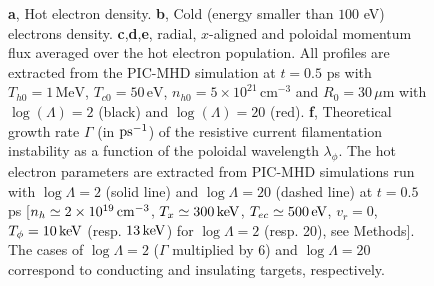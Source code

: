 \documentclass[aps,showpacs,superscriptaddress]{revtex4}
\begin{document}
\begin{figure}[ht]
{\begin{tabular}{ccc}
\end{tabular}}
\caption{\label{fig:nt} 
\textbf{a}, Hot electron  density.
\textbf{b}, Cold (energy smaller than $100$ eV) electrons density.
\textbf{c},\textbf{d},\textbf{e}, radial, $x$-aligned and poloidal momentum flux averaged over the hot electron population.
All profiles are extracted from the  PIC-MHD simulation at $t=0.5$ ps with $T_{h0} = 1\,\mathrm{MeV}$, $T_{c0} = 50\,\mathrm{eV}$, $n_{h0} = 5 \times 10^{21}\, \mathrm{cm}^{-3}$ and $R_0 = 30\,\mu\mathrm{m}$ with $\log(\Lambda)=2$ (black) and $\log(\Lambda)=20$ (red).
\textbf{f}, Theoretical growth rate $\Gamma$ (in $\rm ps^{-1}$) of the resistive current filamentation instability as a function of the poloidal wavelength $\lambda_\phi$. The hot electron parameters are extracted from PIC-MHD simulations run with $\log \Lambda = 2$ (solid line) and $\log \Lambda = 20$ (dashed line) at $t=0.5$ ps [$n_h \simeq 2\times 10^{19}\,\rm cm^{-3}$, $T_x \simeq 300\,\rm keV$, $T_{ec} \simeq 500\,\rm eV$, $v_r=0$,  $T_\phi = 10\,\rm keV$ (resp. $13\,\rm keV$) for $\log \Lambda =2$ (resp. 20), see Methods]. The cases of $\log \Lambda = 2$ ($\Gamma$ multiplied by 6) and $\log \Lambda = 20$ correspond to conducting and insulating targets, respectively.
}
\end{figure}
\end{document}
